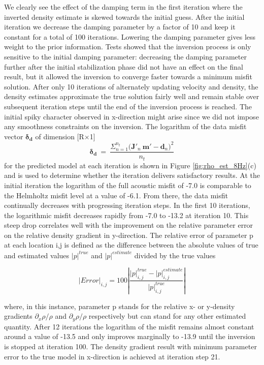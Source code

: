 \documentclass[]{article}
\begin{document}
	We clearly see the effect of the damping term in the first iteration where the inverted density estimate is skewed towards the initial guess. After the initial iteration we decrease the damping parameter by a factor of 10 and keep it constant for a total of 100 iterations. Lowering the damping parameter gives less weight to the prior information. Tests showed that the inversion process is only sensitive to the initial damping parameter: decreasing the damping parameter further after the initial stabilization phase did not have an effect on the final result, but it allowed the inversion to converge faster towards a minimum misfit solution. After only 10 iterations of alternately updating velocity and density, the density estimates approximate the true solution fairly well and remain stable over subsequent iteration steps until the end of the inversion process is reached. The initial spiky character observed in x-direction might arise since we did not impose any smoothness constraints on the inversion. The logarithm of the data misfit vector $\bm{\delta_{d}}$ of dimension [R$\times$1]
	\begin{equation}\label{eq:datamisfit}
		\bm{\delta_{d}} \: = \: \frac{\Sigma_{n=1}^{n_{t}} \big( \bm{J}'_{n} \: \bm{m}' - \bm{d}_{n} \big)^{2}}{n_{t}}
	\end{equation}
	for the predicted model at each iteration is shown in Figure \ref{fig:rho_est_8Hz}(c) and is used to determine whether the iteration delivers satisfactory results. At the initial iteration the logarithm of the full acoustic misfit of -7.0 is comparable to the Helmholtz misfit level at a value of -6.1. From there, the data misfit continually decreases with progressing iteration steps. In the first 10 iterations, the logarithmic misfit decreases rapidly from -7.0 to -13.2 at iteration 10. This steep drop correlates well with the improvement on the relative parameter error on the relative density gradient in y-direction. The relative error of parameter p at each location i,j is defined as the difference between the absolute values of true and estimated values $|p|^{true}$ and $|p|^{estimate}$ divided by the true values
	
	\begin{equation} \label{eq:error}
		|Error|_{i,j} = 100|\frac{|p|^{true}_{i,j} - |p|^{estimate}_{i,j}}{|p|^{true}_{i,j}}|
	\end{equation}

	where, in this instance, parameter p stands for the relative x- or y-density gradients  $\partial_{x} \rho/\rho$ and $\partial_{y} \rho/\rho$ respectively but can stand for any other estimated quantity. After 12 iterations the logarithm of the misfit remains almost constant around a value of -13.5 and only improves marginally to -13.9 until the inversion is stopped at iteration 100. The density gradient result with minimum parameter error to the true model in x-direction is achieved at iteration step 21. \\
	
\end{document}
